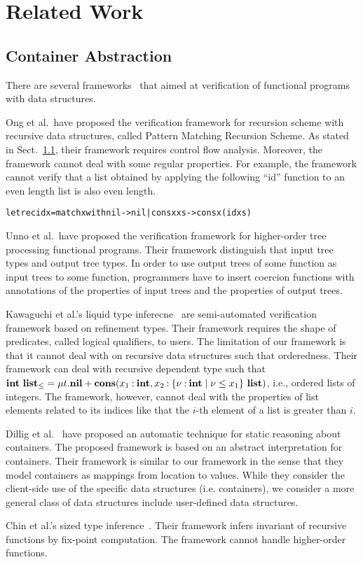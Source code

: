 \section{Related Work}
\label{sec:related}

\subsection{Container Abstraction}
There are several
frameworks~\cite{Kawaguchi2009,Chin2003,Unno2010,Ong2011} that aimed at
verification of functional programs with data structures.

Ong et al.~have proposed the verification framework for recursion scheme with
recursive data structures, called Pattern Matching Recursion Scheme.  As stated in
Sect.~\ref{}, their framework requires control flow analysis. Moreover,
the framework cannot deal with some regular properties. For example, the
framework cannot verify that a list obtained by applying the following
``id'' function to an even length list is also even length.
\begin{alltt}
let rec id x = match x with nil -> nil | cons x xs -> cons x (id xs)
\end{alltt}

Unno et al.~have proposed the verification framework for higher-order
tree processing functional programs. Their framework distinguish that
input tree types and output tree types.  In order to use output trees of
some function as input trees to some function, programmers have to
insert coercion functions with annotations of the properties of input
trees and the properties of output trees.

Kawaguchi et al.'s liquid type inferecne~\cite{Kawaguchi2009} are
semi-automated verification framework based on refinement types.  Their
framework requires the shape of predicates, called logical qualifiers,
to users.  The limitation of our framework is that it cannot deal with
 on recursive data structures such that
orderedness.  Their framework can deal with recursive dependent type
such that ${\mathbf{int}}~{\mathbf{list}_\leq} = \mu t.\mathbf{nil} +
\mathbf{cons}({x_1\mathbin{:}\mathbf{int}},{x_2\mathbin{:}{\{\nu\mathbin{:}\mathbf{int} \mid \nu \leq
x_1\}}~{\mathbf{list}}})$, i.e., ordered lists of integers.  The framework,
however, cannot deal with the properties of list elements related to its
indices like that the $i$-th element of a list is greater than $i$.

Dillig et al.~\cite{Dillig2011} have proposed an automatic technique for
static reasoning about containers.  The proposed framework is based on
an abstract interpretation for containers.  Their framework is similar
to our framework in the sense that they model containers as mappings
from location to values.  While they consider the client-side use of the
specific data structures (i.e. containers), we consider a more general
class of data structures include user-defined data structures.

Chin et al.'s sized type inference~\cite{Chin2003}.  Their framework
infers invariant of recursive functions by fix-point computation.  The
framework cannot handle higher-order functions.


